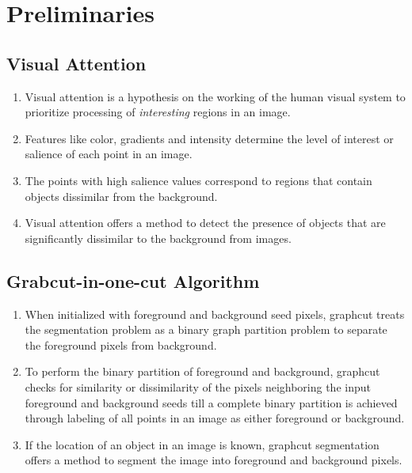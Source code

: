 \documentclass {udthesis}
\begin{document}
\section{Preliminaries}

\subsection{Visual Attention}
\label{sec:visual_attn}

\begin{enumerate}
	\item Visual attention is a hypothesis on the working of the human visual system to prioritize processing of \emph{interesting} regions in an image.

	\item Features like color, gradients and intensity determine the level of interest or salience of each point in an image.
	
	\item The points with high salience values correspond to regions that contain objects dissimilar from the background.
	
	\item Visual attention offers a method to detect the presence of objects that are significantly dissimilar to the background from images.
\end{enumerate}

\subsection{Grabcut-in-one-cut Algorithm}
\label{sec:onecut}

\begin{enumerate}
	\item When initialized with foreground and background seed pixels, graphcut treats the segmentation problem as a binary graph partition problem to separate the foreground pixels from background.
	
	\item To perform the binary partition of foreground and background, graphcut checks for similarity or dissimilarity of the pixels neighboring the input foreground and background seeds till a complete binary partition is achieved through labeling of all points in an image as either foreground or background.
	
	\item If the location of an object in an image is known, graphcut segmentation offers a method to segment the image into foreground and background pixels.
\end{enumerate}
\end{document}

